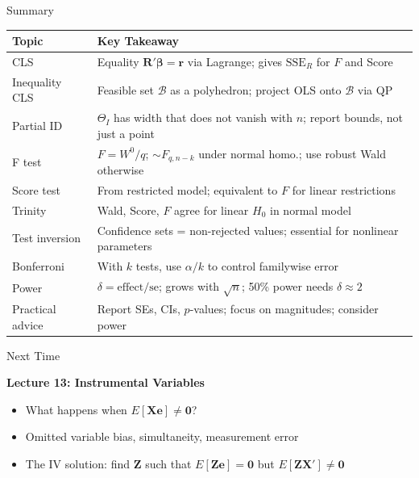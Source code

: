 \documentclass[handout, aspectratio=169]{beamer}
\numberwithin{equation}{section}
\begin{document}
\begin{frame}{Summary}

\begin{center}
\renewcommand{\arraystretch}{1.3}
\small
\renewcommand{\arraystretch}{1.15}
\footnotesize
\begin{tabular}{p{2.8cm}p{9.5cm}}
\toprule
\textbf{Topic} & \textbf{Key Takeaway} \\
\midrule
CLS & Equality $\bm{R}'\bm{\beta} = \bm{r}$ via Lagrange; gives $\text{SSE}_R$ for $F$ and Score \\
Inequality CLS & Feasible set $\mathcal{B}$ as a polyhedron; project OLS onto $\mathcal{B}$ via QP \\
Partial ID & $\Theta_I$ has width that does not vanish with $n$; report bounds, not just a point \\
F test & $F = W^0/q$; $\sim F_{q,n-k}$ under normal homo.; use robust Wald otherwise \\
Score test & From restricted model; equivalent to $F$ for linear restrictions \\
Trinity & Wald, Score, $F$ agree for linear $H_0$ in normal model \\
Test inversion & Confidence sets = non-rejected values; essential for nonlinear parameters \\
Bonferroni & With $k$ tests, use $\alpha/k$ to control familywise error \\
Power & $\delta = \text{effect}/\text{se}$; grows with $\sqrt{n}$; 50\% power needs $\delta \approx 2$ \\
Practical advice & Report SEs, CIs, $p$-values; focus on magnitudes; consider power \\
\bottomrule
\end{tabular}
\end{center}
\end{frame}

\begin{frame}{Next Time}

\textbf{Lecture 13: Instrumental Variables}
\begin{itemize}
\item What happens when $E[\bm{X}\bm{e}] \neq \bm{0}$?
\item Omitted variable bias, simultaneity, measurement error
\item The IV solution: find $\bm{Z}$ such that $E[\bm{Z}\bm{e}] = \bm{0}$ but $E[\bm{Z}\bm{X}'] \neq \bm{0}$
\end{itemize}
\end{frame}
\end{document}
